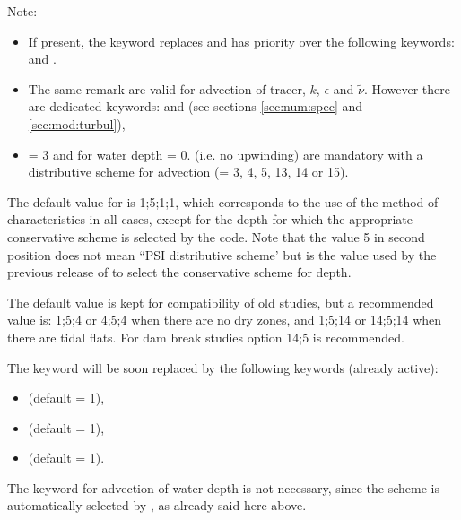 \begin{WarningBlock}{Note:}
\begin{itemize}

\item If present, the keyword 
replaces and has priority over the following keywords:
 and .

\item The same remark are valid for advection of tracer, $k$, $\epsilon$ and
$\tilde{\nu}$.
However there are dedicated keywords: 
and 
(see sections \ref{sec:num:spec} and \ref{sec:mod:turbul}),

\item {} = 3 and  for water depth = 0.
(i.e. no upwinding) are mandatory with a distributive scheme
for advection (= 3, 4, 5, 13, 14 or 15).
\end{itemize}
\end{WarningBlock}

The default value for  is 1;5;1;1, which corresponds
to the use of the method of characteristics in all cases, except for the depth
for which the appropriate conservative scheme is selected by the code.
Note that the value 5 in second position does not mean
``PSI distributive scheme' but is the value used by the previous release
of  to select the conservative scheme for depth.

The default value is kept for compatibility of old studies,
but a recommended value is: 1;5;4 or 4;5;4 when there are no dry zones,
and 1;5;14 or 14;5;14 when there are tidal flats.
For dam break studies option 14;5 is recommended.

The keyword  will be soon replaced
by the following keywords (already active):
\begin{itemize}
\item {} (default = 1),
\item {} (default = 1),
\item {} (default = 1).
\end{itemize}
The keyword for advection of water depth is not necessary, since the scheme is
automatically selected by , as already said here above.

